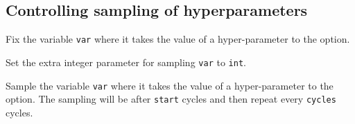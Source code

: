 \documentclass[a4paper,english]{article}
\begin{document}
\subsection{Controlling sampling of hyperparameters}
\begin{Description}\setlength{\itemsep}{0cm}

\item[\OptArg{-F}{var}]
Fix the variable \texttt{var} where
it takes the value of a hyper-parameter to the  option.
\item[\OptArg{-g}{var,int}]
Set the extra integer parameter for sampling \texttt{var} to \texttt{int}.
\item[\OptArg{-G}{var,cycles,start}]
Sample the variable \texttt{var} where
it takes the value of a hyper-parameter to the  option. 
The sampling will be  after \texttt{start} cycles and then repeat every \texttt{cycles} cycles.

\end{Description}
\end{document}
